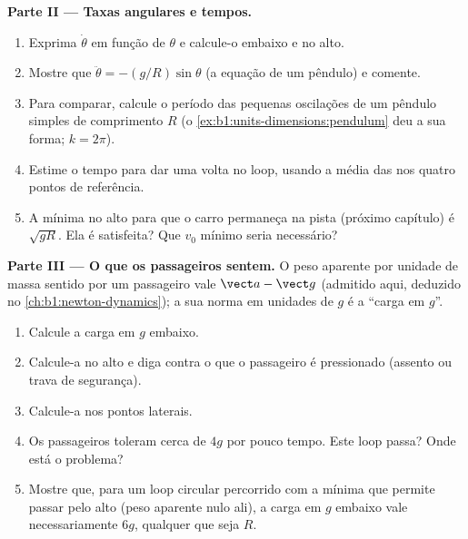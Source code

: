 \begin{problem}
\medskip
\noindent\textbf{Parte II --- Taxas angulares e tempos.}
\begin{enumerate}[resume]
  \item Exprima $\dot\theta$ em função de $\theta$ e calcule-o
        embaixo e no alto.
  \item Mostre que $\ddot\theta = -(g/R)\sin\theta$ (a equação de um
        pêndulo) e comente.
  \item Para comparar, calcule o período das pequenas oscilações de um
        pêndulo simples de comprimento $R$ (o \cref{ex:b1:units-dimensions:pendulum}
        deu a sua forma; $k = 2\pi$).
  \item Estime o tempo para dar uma volta no loop, usando a média das
         nos quatro pontos de referência.
  \item A  mínima no alto para que o carro permaneça na pista
        (próximo capítulo) é $\sqrt{gR}$. Ela é satisfeita? Que
        $v_0$ mínimo seria necessário?
\end{enumerate}

\medskip
\noindent\textbf{Parte III --- O que os passageiros sentem.}
O peso aparente por unidade de massa sentido por um passageiro vale $\vect a - \vect g$
(admitido aqui, deduzido no \cref{ch:b1:newton-dynamics}); a sua norma em
unidades de $g$ é a ``carga em $g$''.
\begin{enumerate}[resume]
  \item Calcule a carga em $g$ embaixo.
  \item Calcule-a no alto e diga contra o que o passageiro é pressionado
        (assento ou trava de segurança).
  \item Calcule-a nos pontos laterais.
  \item Os passageiros toleram cerca de $4g$ por pouco tempo. Este loop passa? Onde
        está o problema?
  \item Mostre que, para um loop circular percorrido com a 
        mínima que permite passar pelo alto (peso aparente nulo ali), a carga em $g$ embaixo
        vale necessariamente $6g$, qualquer que seja $R$.
\end{enumerate}


\end{problem}
